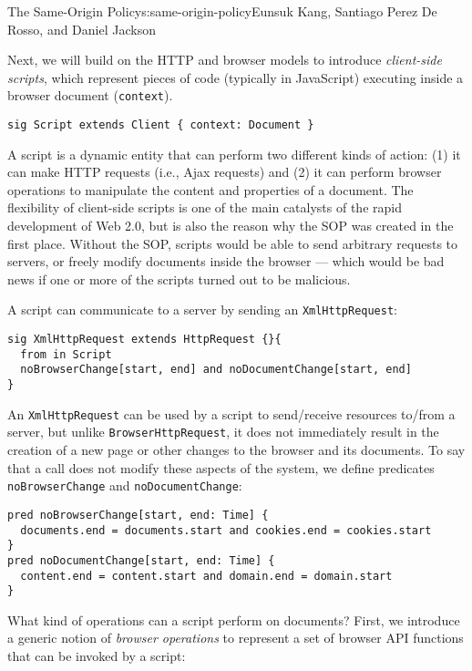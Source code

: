 \begin{aosachapter}{The Same-Origin Policy}{s:same-origin-policy}{Eunsuk Kang, Santiago Perez De Rosso, and Daniel Jackson}
\label{script}

Next, we will build on the HTTP and browser models to introduce
\emph{client-side scripts}, which represent pieces of code (typically in
JavaScript) executing inside a browser document (\texttt{context}).

\begin{verbatim}
sig Script extends Client { context: Document }
\end{verbatim}

A script is a dynamic entity that can perform two different kinds of
action: (1) it can make HTTP requests (i.e., Ajax requests) and (2) it
can perform browser operations to manipulate the content and properties
of a document. The flexibility of client-side scripts is one of the main
catalysts of the rapid development of Web 2.0, but is also the reason
why the SOP was created in the first place. Without the SOP, scripts
would be able to send arbitrary requests to servers, or freely modify
documents inside the browser --- which would be bad news if one or more
of the scripts turned out to be malicious.

A script can communicate to a server by sending an
\texttt{XmlHttpRequest}:

\begin{verbatim}
sig XmlHttpRequest extends HttpRequest {}{
  from in Script
  noBrowserChange[start, end] and noDocumentChange[start, end]
}
\end{verbatim}

An \texttt{XmlHttpRequest} can be used by a script to send/receive
resources to/from a server, but unlike \texttt{BrowserHttpRequest}, it
does not immediately result in the creation of a new page or other
changes to the browser and its documents. To say that a call does not
modify these aspects of the system, we define predicates
\texttt{noBrowserChange} and \texttt{noDocumentChange}:

\begin{verbatim}
pred noBrowserChange[start, end: Time] {
  documents.end = documents.start and cookies.end = cookies.start  
}
pred noDocumentChange[start, end: Time] {
  content.end = content.start and domain.end = domain.start  
}
\end{verbatim}

What kind of operations can a script perform on documents? First, we
introduce a generic notion of \emph{browser operations} to represent a
set of browser API functions that can be invoked by a script:


\end{aosachapter}
